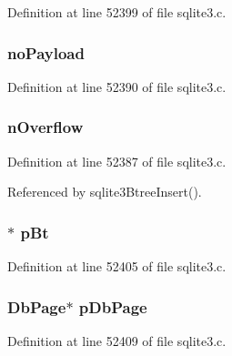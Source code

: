 Definition at line 52399 of file sqlite3.\+c.

\hypertarget{struct_mem_page_a4453f74c1cd8ac8c8312c04ddb840094}{}
\subsubsection[{no\+Payload}]{ no\+Payload}\label{struct_mem_page_a4453f74c1cd8ac8c8312c04ddb840094}


Definition at line 52390 of file sqlite3.\+c.

\hypertarget{struct_mem_page_a178fc8eac371aba46bbdb4042d2b6040}{}
\subsubsection[{n\+Overflow}]{ n\+Overflow}\label{struct_mem_page_a178fc8eac371aba46bbdb4042d2b6040}


Definition at line 52387 of file sqlite3.\+c.



Referenced by sqlite3\+Btree\+Insert().

\hypertarget{struct_mem_page_a2bc66d19c064bb25ff335241f8c621df}{}
\subsubsection[{p\+Bt}]{$\ast$ p\+Bt}\label{struct_mem_page_a2bc66d19c064bb25ff335241f8c621df}


Definition at line 52405 of file sqlite3.\+c.

\hypertarget{struct_mem_page_aa1db4f5467c8257caf8afe796f799c98}{}
\subsubsection[{p\+Db\+Page}]{\setlength{\rightskip}{0pt plus 5cm}Db\+Page$\ast$ p\+Db\+Page}\label{struct_mem_page_aa1db4f5467c8257caf8afe796f799c98}


Definition at line 52409 of file sqlite3.\+c.



